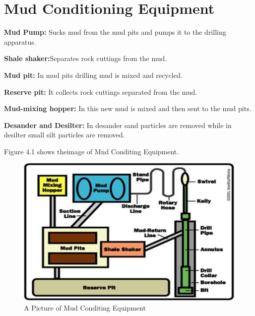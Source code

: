 \chapter{Mud Conditioning Equipment}

\textbf{Mud Pump:} Sucks mud from the mud pits and pumps it to the drilling apparatus.

\vspace{1em}

\noindent \textbf{Shale shaker:}Separates rock cuttings from the mud.

\vspace{1em}

\noindent \textbf{Mud pit:} In mud pits drilling mud is mixed and recycled. 

\vspace{1em}

\noindent \textbf{Reserve pit:} It collects rock cuttings separated from the mud.

\vspace{1em}

\noindent \textbf{Mud-mixing hopper:} In this new mud is mixed and then sent to the mud pits.

\vspace{1em}

\noindent \textbf{Desander and Desilter:} In desander sand particles are removed while in desilter small silt particles are removed.

\vspace{1em}

\noindent Figure 4.1 shows theimage of Mud Conditing Equipment.

\vspace{1em}

\begin{figure}[h]
\includegraphics[scale=0.6]{images/Mudconditingequipment}
\centering 
\caption{A Picture of Mud Conditing Equipment}
\end{figure}



